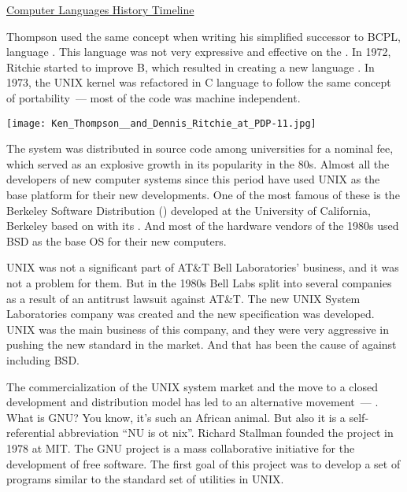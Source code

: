 \href{http://www.levenez.com/lang/}{Computer Languages History Timeline}

Thompson used the same concept when writing his simplified successor to BCPL,
language . This language was not very expressive and effective on
the . In 1972, Ritchie started to improve B, which resulted in
creating a new language . In 1973, the UNIX kernel was refactored in C language
to follow the same concept of portability~--- most of the code was machine
independent.
\begin{center}
\texttt{[image: Ken\_Thompson\_\_and\_Dennis\_Ritchie\_at\_PDP-11.jpg]}
\end{center}

The system was distributed in source code among universities for a nominal fee,
which served as an explosive growth in its popularity in the 80s.
Almost all the developers of new computer systems since this period have used
UNIX as the base platform for their new developments. One of the most famous of
these is the Berkeley Software Distribution () developed at
the University of California, Berkeley based on 
with its . And most of the hardware vendors of
the 1980s used BSD as the base OS for their new computers.

UNIX was not a significant part of AT\&T Bell Laboratories' business,
and it was not a problem for them. But in the 1980s Bell Labs split
into several companies as a result of an antitrust lawsuit against AT\&T.
The new UNIX System Laboratories company was created and the new
 specification was developed. UNIX was the main business
of this company, and they were very aggressive in pushing the new standard in
the market. And that has been the cause of  against
 including BSD.

The commercialization of the UNIX system market and the move to a closed
development and distribution model has led to an alternative movement~---
. What is GNU? You know, it's such an African animal. But also it
is a self-referential abbreviation ``NU is ot nix''.
Richard Stallman founded the project in 1978 at MIT. The GNU project is a mass
collaborative initiative for the development of free software. The first
goal of this project was to develop a set of programs similar to
the standard set of utilities in UNIX.

